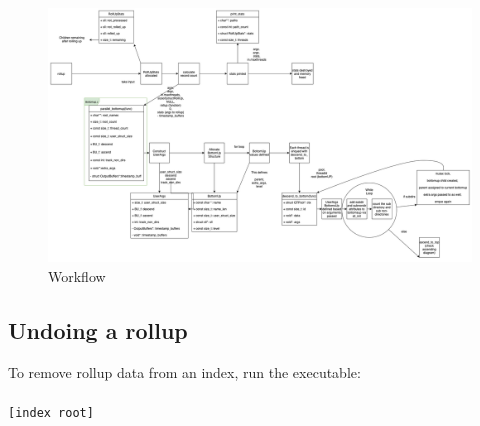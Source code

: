 \begin{figure} [!htb]
  \centering \includegraphics[width=\textwidth]{images/rollup.png}
  \caption{\rollup Workflow}
  \label{fig:rollupworkflow}
\end{figure}

\subsection{Undoing a rollup}
To remove rollup data from an index, run the \unrollup executable:
\\\\
\indent \unrollup \texttt{[index root]}
